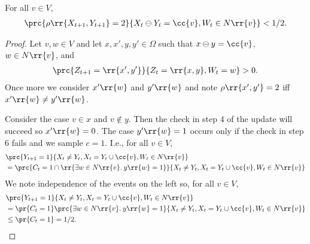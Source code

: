 \documentclass{article}
\begin{document}
\begin{claim*}[3c]
  For all $v\in V$,
  \begin{align*}
    \prc{\rho\rr{X_{t+1},Y_{t+1}}=2}{X_t\ominus Y_t=\cc{v},W_t\in N\rr{v}}<1/2.
  \end{align*}
  \begin{proof}
    Let $v,w\in V$ and let $x,x',y,y'\in\Omega$ such that $x\ominus y=\cc{v}$,
    $w\in N\rr{v}$, and
    \begin{align*}
      \prc{Z_{t+1}=\rr{x',y'}}{Z_t=\rr{x,y},W_t=w}>0.
    \end{align*}
    Once more we consider $x'\rr{w}$ and $y'\rr{w}$ and note $\rho\rr{x', y'}=2$
    iff $x'\rr{w}\neq y'\rr{w}$.

    Consider the case $v\in x$ and $v\not\in y$. Then the check in step 4 of the update
    will succeed so $x'\rr{w}=0$. The case $y'\rr{w}=1$ occurs only if the check in step
    6 fails and we sample $c=1$. I.e., for all $v\in V$,
    \begin{align*}
      &\prc{Y_{t+1}=1}{X_t\neq Y_t, X_t=Y_t\cup\cc{v},W_t\in N\rr{v}}\\
      &= \prc{C_t=1\cap\rr{\exists w\in N\rr{v}. \: y\rr{w}=1}}{X_t\neq Y_t, X_t=Y_t\cup\cc{v},W_t\in N\rr{v}}
    \end{align*}
    We note independence of the events on the left so, for all $v\in V$,
    \begin{align*}
      &\prc{Y_{t+1}=1}{X_t\neq Y_t, X_t=Y_t\cup\cc{v},W_t\in N\rr{v}}\\
      &=\pr{C_t=1}\prc{\exists w\in N\rr{v}. \: y\rr{w}=1}{X_t\neq Y_t, X_t=Y_t\cup\cc{v},W_t\in N\rr{v}}\\
      &\leq\pr{C_t=1} = 1/2.
    \end{align*}
  \end{proof}
\end{claim*}
\end{document}
